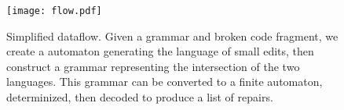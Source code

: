 \documentclass[runningheads]{llncs}
\begin{document}
  \begin{figure}[h!]
    \texttt{[image: flow.pdf]}\vspace{-1pt}

    \caption{Simplified dataflow. Given a grammar and broken code fragment, we create a automaton generating the language of small edits, then construct a grammar representing the intersection of the two languages. This grammar can be converted to a finite automaton, determinized, then decoded to produce a list of repairs.}\label{fig:arch_simp}
  \end{figure}
\end{document}
